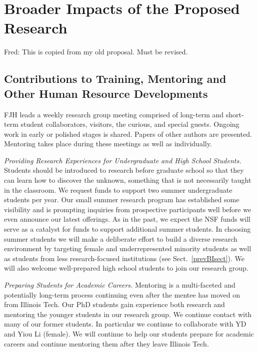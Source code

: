 \documentclass[11pt]{NSFamsart}
\newcommand{\FJHNote}[1]{{\color{blue}Fred: #1}}
\begin{document}
\section{Broader Impacts of the Proposed Research}\label{SectBroad}
\FJHNote{This is copied from my old proposal.  Must be revised.}


\subsection{Contributions to Training, Mentoring and Other Human Resource Developments}
FJH leads a weekly research group meeting comprised of long-term and short-term student 
collaborators, visitors, the curious, and special guests.  Ongoing work in early or polished stages is shared.  Papers of other authors are presented.  Mentoring takes place during these meetings as well as individually.

\emph{Providing Research Experiences for Undergraduate and High School Students.} Students 
should be introduced to research before graduate school so that they can learn how to 
discover the unknown, something that is not necessarily taught in the classroom. We request funds 
to 
support two summer undergraduate students per year.  Our small summer research program has established some visibility 
and is prompting inquiries from prospective participants well before we 
even announce our latest 
offerings. As in the past, we expect the NSF funds will serve as a catalyst for funds to 
support additional summer students. In choosing summer students we will make a deliberate effort to 
build 
a diverse research environment by targeting female and underrepresented minority students as well 
as students from less research-focused institutions (see Sect.~\ref{prevBIsect}). We will also 
welcome well-prepared high school students to join our research group.

\emph{Preparing Students for Academic Careers.} Mentoring is a multi-faceted and 
potentially long-term process continuing even after the mentee has moved on from Illinois Tech.  
Our PhD students gain experience both research and mentoring the younger students in our 
research group.  We 
continue contact with many of our former students.  In particular we continue to 
collaborate with YD and Yiou Li (female).  We will continue to help our students prepare for 
academic careers and continue mentoring them after they leave Illinois Tech.
\end{document}
